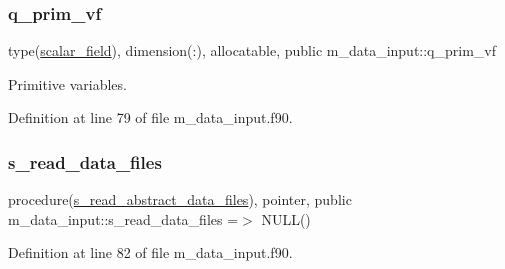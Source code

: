 \subsubsection{\texorpdfstring{q\+\_\+prim\+\_\+vf}{q\_prim\_vf}}
{\footnotesize\ttfamily type(\hyperlink{structm__derived__types_1_1scalar__field}{scalar\+\_\+field}), dimension(\+:), allocatable, public m\+\_\+data\+\_\+input\+::q\+\_\+prim\+\_\+vf}



Primitive variables. 



Definition at line 79 of file m\+\_\+data\+\_\+input.\+f90.

\mbox{\label{namespacem__data__input_aba1cbfb151ed869483feb37291104830}} 
\subsubsection{\texorpdfstring{s\+\_\+read\+\_\+data\+\_\+files}{s\_read\_data\_files}}
{\footnotesize\ttfamily procedure(\hyperlink{interfacem__data__input_1_1s__read__abstract__data__files}{s\+\_\+read\+\_\+abstract\+\_\+data\+\_\+files}), pointer, public m\+\_\+data\+\_\+input\+::s\+\_\+read\+\_\+data\+\_\+files =$>$ N\+U\+LL()}



Definition at line 82 of file m\+\_\+data\+\_\+input.\+f90.


